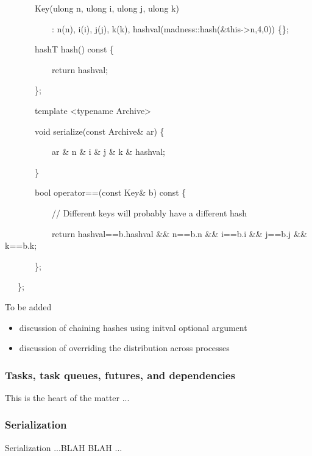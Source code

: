 \documentclass[letterpaper]{article}
\newcommand\liststyleLvi{%
\renewcommand\labelitemi{${\bullet}$}
\renewcommand\labelitemii{${\circ}$}
\renewcommand\labelitemiii{${\blacksquare}$}
\renewcommand\labelitemiv{${\bullet}$}
}
\begin{document}
{\ttfamily
\ \ \ \ \ \ \ Key(ulong n, ulong i, ulong j, ulong k)}

{\ttfamily
\ \ \ \ \ \ \ \ \ \ \ : n(n), i(i), j(j), k(k), hashval(madness::hash(\&this-{\textgreater}n,4,0)) \{\};}


\bigskip

{\ttfamily
\ \ \ \ \ \ \ hashT hash() const \{}

{\ttfamily
\ \ \ \ \ \ \ \ \ \ \ return hashval;}

{\ttfamily
\ \ \ \ \ \ \ \};}


\bigskip

{\ttfamily
\ \ \ \ \ \ \ template {\textless}typename Archive{\textgreater}}

{\ttfamily
\ \ \ \ \ \ \ void serialize(const Archive\& ar) \{}

{\ttfamily
\ \ \ \ \ \ \ \ \ \ \ ar \& n \& i \& j \& k \& hashval;}

{\ttfamily
\ \ \ \ \ \ \ \}}


\bigskip

{\ttfamily
\ \ \ \ \ \ \ bool operator==(const Key\& b) const \{}

{\ttfamily
\ \ \ \ \ \ \ \ \ \ \ // Different keys will probably have a different hash}

{\ttfamily
\ \ \ \ \ \ \ \ \ \ \ return hashval==b.hashval \&\& n==b.n \&\& i==b.i \&\& j==b.j \&\& k==b.k;}

{\ttfamily
\ \ \ \ \ \ \ \};}

{\ttfamily
\ \ \ \};}


\bigskip

To be added

\liststyleLvi
\begin{itemize}
\item discussion of chaining hashes using initval optional argument
\item discussion of overriding the distribution across processes
\end{itemize}

\bigskip

\subsubsection{Tasks, task queues, futures, and dependencies}
This is the heart of the matter ...

\subsubsection{Serialization}
Serialization ...BLAH BLAH ...
\end{document}
